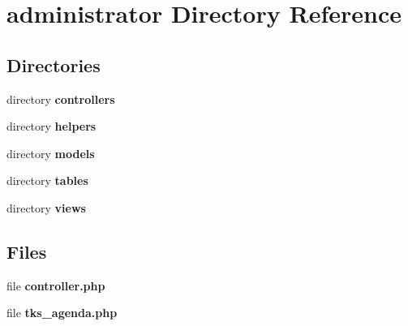 \section{administrator Directory Reference}
\label{dir_a0bc8d0017255ccc2733fb4bbaccd09a}
\subsection*{Directories}
\begin{DoxyCompactItemize}
\item 
directory \textbf{ controllers}
\item 
directory \textbf{ helpers}
\item 
directory \textbf{ models}
\item 
directory \textbf{ tables}
\item 
directory \textbf{ views}
\end{DoxyCompactItemize}
\subsection*{Files}
\begin{DoxyCompactItemize}
\item 
file \textbf{ controller.\+php}
\item 
file \textbf{ tks\+\_\+agenda.\+php}
\end{DoxyCompactItemize}
